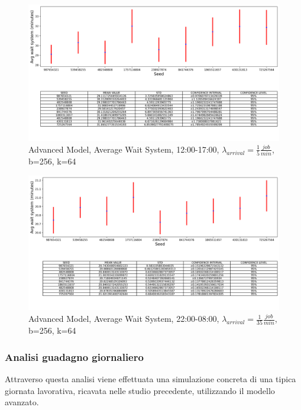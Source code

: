 \documentclass{article}
\begin{document}
\begin{figure}[H]
	\centering
	\captionsetup{justification=centering,margin=2cm}
	\includegraphics[scale=0.48]{images/adv_avg_ws_steady_state_aft.png}
	\caption{Advanced Model, Average Wait System, 12:00-17:00, $\lambda_{arrival}=\frac{1}{5} \frac{job}{min}$, b=256, k=64}\label{figura:adv_avg_ws_steady_state_aft}
\end{figure}

\begin{figure}[H]
	\centering
	\captionsetup{justification=centering,margin=2cm}
	\includegraphics[scale=0.48]{images/adv_avg_ws_steady_state_night.png}
	\caption{Advanced Model, Average Wait System, 22:00-08:00, $\lambda_{arrival}=\frac{1}{35} \frac{job}{min}$, b=256, k=64}\label{figura:adv_avg_ws_steady_state_night}
\end{figure}

\subsubsection{Analisi guadagno giornaliero}
Attraverso questa analisi viene effettuata una simulazione concreta di una tipica giornata lavorativa, ricavata nelle studio precedente, utilizzando il modello avanzato.
\end{document}
